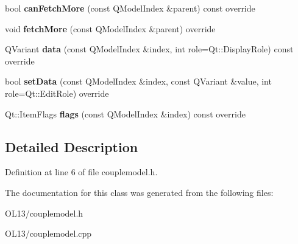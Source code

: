 \begin{DoxyCompactItemize}
bool {\bfseries can\+Fetch\+More} (const Q\+Model\+Index \&parent) const override
\item 
\mbox{\label{class_couple_model_a06bc748897683262a2415d6b1e36291d}} 
void {\bfseries fetch\+More} (const Q\+Model\+Index \&parent) override
\item 
\mbox{\label{class_couple_model_a118e5b04045603124e1e7da896cdb069}} 
Q\+Variant {\bfseries data} (const Q\+Model\+Index \&index, int role=Qt\+::\+Display\+Role) const override
\item 
\mbox{\label{class_couple_model_a495c1455dcae117e7e6901e021c96618}} 
bool {\bfseries set\+Data} (const Q\+Model\+Index \&index, const Q\+Variant \&value, int role=Qt\+::\+Edit\+Role) override
\item 
\mbox{\label{class_couple_model_afa65bca54760754a52aa5124bbd1375b}} 
Qt\+::\+Item\+Flags {\bfseries flags} (const Q\+Model\+Index \&index) const override
\end{DoxyCompactItemize}


\subsection{Detailed Description}


Definition at line 6 of file couplemodel.\+h.



The documentation for this class was generated from the following files\+:\begin{DoxyCompactItemize}
\item 
O\+L13/couplemodel.\+h\item 
O\+L13/couplemodel.\+cpp\end{DoxyCompactItemize}
